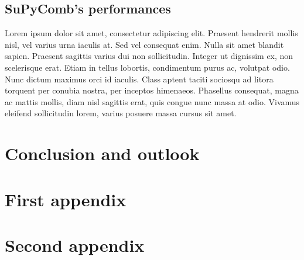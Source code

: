 \documentclass[a4paper, 11pt]{report}
\begin{document}
\section{SuPyComb's performances}%

Lorem ipsum dolor sit amet, consectetur adipiscing elit.
Praesent hendrerit mollis nisl, vel varius urna iaculis at.
Sed vel consequat enim.
Nulla sit amet blandit sapien.
Praesent sagittis varius dui non sollicitudin.
Integer ut dignissim ex, non scelerisque erat.
Etiam in tellus lobortis, condimentum purus ac, volutpat odio.
Nunc dictum maximus orci id iaculis.
Class aptent taciti sociosqu ad litora torquent per conubia nostra, 
per inceptos himenaeos.
Phasellus consequat, magna ac mattis mollis, diam nisl sagittis erat, 
quis congue nunc massa at odio.
Vivamus eleifend sollicitudin lorem, varius posuere massa cursus sit 
amet.


\chapter*{Conclusion and outlook}


\newpage                 %



\appendix


\chapter{First appendix}

\chapter{Second appendix}
\end{document}
